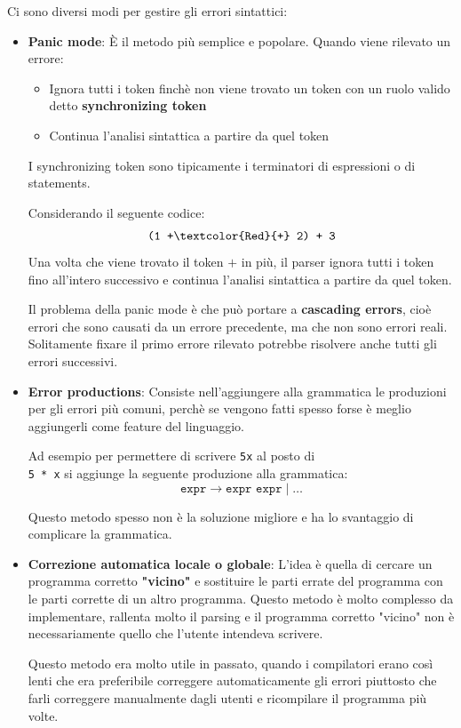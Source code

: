 \documentclass[a4paper]{article}
\begin{document}
\noindent
Ci sono diversi modi per gestire gli errori sintattici:
\begin{itemize}
  \item \textbf{Panic mode}: È il metodo più semplice e popolare. Quando viene rilevato
    un errore:
    \begin{itemize}
      \item Ignora tutti i token finchè non viene trovato un token con un ruolo valido
        detto \textbf{synchronizing token}
      \item Continua l'analisi sintattica a partire da quel token
    \end{itemize}
    I synchronizing token sono tipicamente i terminatori di espressioni o di statements.

    \begin{example}
      Considerando il seguente codice:
      \[
        \texttt{(1 +\textcolor{Red}{+} 2) + 3}
      \] 
      Una volta che viene trovato il token \( + \) in più, il parser ignora tutti i
      token fino all'intero successivo e continua l'analisi sintattica a partire da quel
      token.
    \end{example}

    \noindent
    Il problema della panic mode è che può portare a \textbf{cascading errors}, cioè
    errori che sono causati da un errore precedente, ma che non sono errori reali.
    Solitamente fixare il primo errore rilevato potrebbe risolvere anche tutti gli
    errori successivi.

  \item \textbf{Error productions}: Consiste nell'aggiungere alla grammatica le
    produzioni per gli errori più comuni, perchè se vengono fatti spesso forse è
    meglio aggiungerli come feature del linguaggio.

    \begin{example}
      Ad esempio per permettere di scrivere \texttt{5x} al posto di\\ \texttt{5 * x}
      si aggiunge la seguente produzione alla grammatica:
      \[
        \texttt{expr} \to \texttt{expr expr} \mid \ldots
      \] 
    \end{example}

    \noindent
    Questo metodo spesso non è la soluzione migliore e ha lo svantaggio di complicare
    la grammatica.

  \item \textbf{Correzione automatica locale o globale}: L'idea è quella di cercare
    un programma corretto \textbf{"vicino"} e sostituire le parti errate del
    programma con le parti corrette di un altro programma. Questo metodo è molto
    complesso da implementare, rallenta molto il parsing e il programma corretto "vicino"
    non è necessariamente quello che l'utente intendeva scrivere.

    Questo metodo era molto utile in passato, quando i compilatori erano così lenti
    che era preferibile correggere automaticamente gli errori piuttosto che farli
    correggere manualmente dagli utenti e ricompilare il programma più volte.
\end{itemize}
\end{document}
